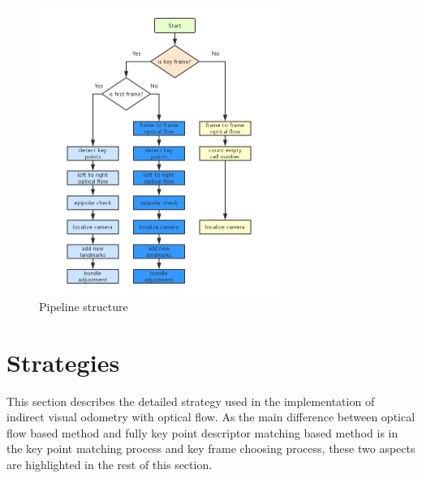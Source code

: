 \documentclass[11pt]{easychair}
\begin{document}
\begin{figure}[h!]
	\centering
	\includegraphics[width=0.7\textwidth]{img/flowchart.png}
	\caption{Pipeline structure}
	\label{fig:pipeline structure}
\end{figure}



\section{Strategies}
This section describes the detailed strategy used in the implementation of indirect visual odometry with optical flow. As the main difference between optical flow based method and fully key point descriptor matching based method is in the key point matching process and key frame choosing process, these two aspects are highlighted in the rest of this section.

\end{document}
